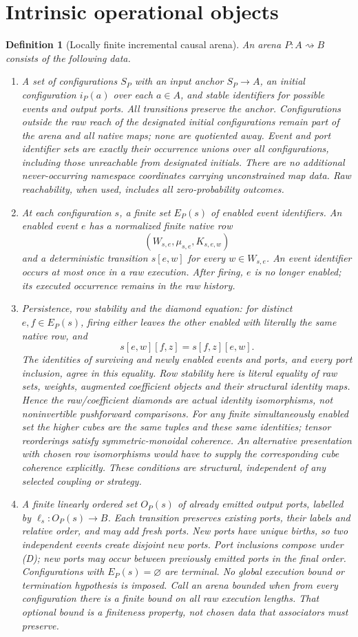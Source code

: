\documentclass[11pt]{article}
\newtheorem{definition}{Definition}\newtheorem{theorem}[definition]{Theorem}\newtheorem{proposition}[definition]{Proposition}
\begin{document}
\section{Intrinsic operational objects}
\begin{definition}[Locally finite incremental causal arena]
An arena $P:A\rightsquigarrow B$ consists of the following data.
\begin{enumerate}
\item A set of configurations $S_P$ with an input anchor $S_P\to A$, an initial configuration $i_P(a)$ over each $a\in A$, and stable identifiers for possible events and output ports. All transitions preserve the anchor. Configurations outside the raw reach of the designated initial configurations remain part of the arena and all native maps; none are quotiented away. Event and port identifier sets are exactly their occurrence unions over all configurations, including those unreachable from designated initials. There are no additional never-occurring namespace coordinates carrying unconstrained map data. Raw reachability, when used, includes all zero-probability outcomes.
\item At each configuration $s$, a finite set $E_P(s)$ of enabled event identifiers. An enabled event $e$ has a normalized finite native row
\[
 (W_{s,e},\mu_{s,e},K_{s,e,w})
\]
and a deterministic transition $s[e,w]$ for every $w\in W_{s,e}$. An event identifier occurs at most once in a raw execution. After firing, $e$ is no longer enabled; its executed occurrence remains in the raw history.
\item Persistence, row stability and the diamond equation: for distinct $e,f\in E_P(s)$, firing either leaves the other enabled with literally the same native row, and
\[
 s[e,w][f,z]=s[f,z][e,w].\tag{D}
\]
The identities of surviving and newly enabled events and ports, and every port inclusion, agree in this equality. Row stability here is literal equality of raw sets, weights, augmented coefficient objects and their structural identity maps. Hence the raw/coefficient diamonds are actual identity isomorphisms, not noninvertible pushforward comparisons. For any finite simultaneously enabled set the higher cubes are the same tuples and these same identities; tensor reorderings satisfy symmetric-monoidal coherence. An alternative presentation with chosen row isomorphisms would have to supply the corresponding cube coherence explicitly. These conditions are structural, independent of any selected coupling or strategy.
\item A finite linearly ordered set $O_P(s)$ of already emitted output ports, labelled by $\ell_s:O_P(s)\to B$. Each transition preserves existing ports, their labels and relative order, and may add fresh ports. New ports have unique births, so two independent events create disjoint new ports. Port inclusions compose under (D); new ports may occur between previously emitted ports in the final order. Configurations with $E_P(s)=\varnothing$ are terminal. No global execution bound or termination hypothesis is imposed. Call an arena bounded when from every configuration there is a finite bound on all raw execution lengths. That optional bound is a finiteness property, not chosen data that associators must preserve.

\end{enumerate}
\end{definition}
\end{document}
